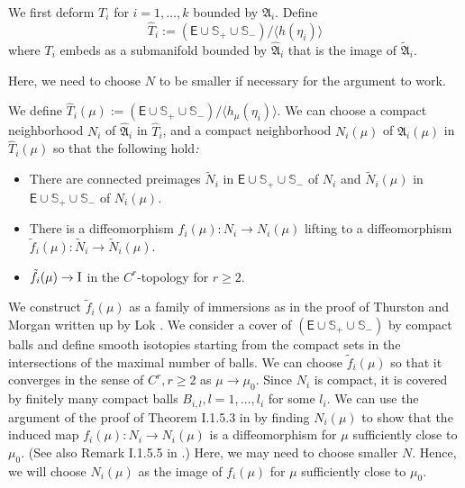 \documentclass{amsart}
\numberwithin{equation}{section}
\newcommand\ra{\rightarrow}
\newcommand\Idd{{\rm I}}
\newcommand\Ss{{\mathbb{S}}}
\newcommand\Lspace{\mathsf E}
\theoremstyle{definition}
\theoremstyle{remark}
\begin{document}
We first deform $T_i$ for $i=1, \dots, k$ bounded by ${\mathfrak{A}}_i$. %
%
Define 
\[\hat T_i :=(\Lspace \cup \Ss_+\cup \Ss_-)/\langle h(\eta_i)\rangle\] where $T_i$ embeds
as a submanifold  bounded by $\hat {\mathfrak{A}}_i$ that is the image of $\tilde {\mathfrak{A}}_i$. 

Here, we need to choose $N$ to be smaller if necessary for the argument to work. 

We define $\hat T_i(\mu):= (\Lspace \cup \Ss_+\cup \Ss_-)/\langle h_\mu(\eta_i)\rangle$. 
We can choose a compact neighborhood $N_i$ of $\hat{\mathfrak{A}}_i$ in $\hat T_i$, 
and a compact neighborhood $N_i(\mu)$ of ${\mathfrak{A}}_i(\mu)$ in $\hat T_i(\mu)$ so that the following hold{\em :}
\begin{itemize}
\item There are connected 
preimages $\tilde N_i$ in $\Lspace \cup \Ss_+\cup \Ss_-$ of $N_i$
and $\tilde N_i(\mu)$ in $\Lspace \cup \Ss_+ \cup \Ss_-$ of $N_i(\mu)$.
\item There is a diffeomorphism $f_i(\mu): N_i \ra N_i(\mu)$ 
lifting to a diffeomorphism $\tilde f_i(\mu): \tilde N_i \ra \tilde N_i(\mu)$. 
\item $\tilde f_i(\mu) \ra \Idd$ in the $C^r$-topology for $r \geq 2$.
\end{itemize}
We construct $\tilde f_i(\mu)$ as a family of immersions 
as in  the proof of Thurston and Morgan 
written up by Lok \cite{Lok84}. 
We consider a cover of
$(\Lspace \cup \Ss_+\cup \Ss_-)$
by compact balls and define smooth isotopies 
starting from the compact sets in the intersections of the maximal number of balls. 
We can choose $\tilde f_i(\mu)$ so that it converges 
in the sense of $C^{r}, r \geq 2$ as 
$\mu \ra \mu_0$. 
Since $N_i$ is compact, it is covered by finitely many compact balls $B_{i, l}, l=1, \dots, l_i$ for some $l_i$. 
We can use the argument of the proof of Theorem I.1.5.3 in \cite{CEG06} by finding $N_i(\mu)$ to show that 
the induced map $f_i(\mu): N_i \ra N_i(\mu)$ is a diffeomorphism
for $\mu$ sufficiently close to  $\mu_0$.  (See also Remark I.1.5.5 in \cite{CEG06}.) Here, 
we may need to choose smaller $N$.
Hence, we will choose $N_i(\mu)$ as the image of $f_i(\mu)$ for 
$\mu$ sufficiently close to $\mu_0$.
\end{document}
